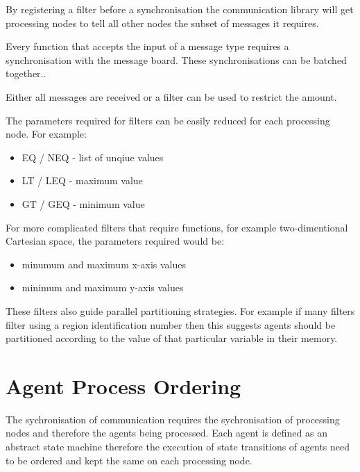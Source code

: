 \documentclass{aamas2009}
\begin{document}
By registering a filter before a synchronisation the communication library will
get processing nodes to tell all other nodes the subset of messages it requires.

Every function that accepts the input of a message type requires a
synchronisation with the message board.
These synchronisations can be batched together..


Either all messages are received or a filter can be used to restrict the amount.

The parameters required for filters can be easily reduced for each processing
node. For example:

\begin{itemize}
  \item EQ / NEQ - list of unqiue values
  \item LT / LEQ - maximum value
  \item GT / GEQ - minimum value
\end{itemize}

For more complicated filters that require functions, for example
two-dimentional Cartesian space, the parameters required would be:

\begin{itemize}
  \item minumum and maximum x-axis values
  \item minimum and maximum y-axis values
\end{itemize}

These filters also guide parallel partitioning strategies. For example if many
filters filter using a region identification number then this suggests agents
should be partitioned according to the value of that particular variable in
their memory.

\section{Agent Process Ordering}

The sychronisation of communication requires the sychronisation of processing
nodes and therefore the agents being processed.
Each agent is defined as an abstract state machine therefore the execution of 
state transitions of agents need to be ordered and kept the same on each
processing node.

\end{document}
